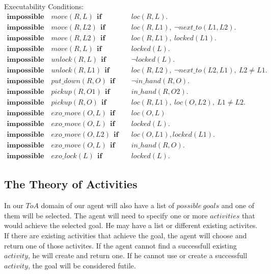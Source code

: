 \documentclass[11pt, oneside]{article}
\begin{document}
Executability Conditions:
\begin{align*}
  \mathbf{impossible}\quad move(R, L)~~\mathbf{if}&\quad loc(R,L).\\
  \mathbf{impossible}\quad move(R, L2)~~\mathbf{if}&\quad loc(R,L1),~\neg next\_to(L1,L2).\\
  \mathbf{impossible}\quad move(R,L2)~~\mathbf{if}&\quad loc(R,L1),~locked(L1).\\
  \mathbf{impossible}\quad move(R,L)~~\mathbf{if}&\quad locked(L).\\
  \mathbf{impossible}\quad unlock(R, L)~~\mathbf{if}&\quad \neg locked(L).\\
  \mathbf{impossible}\quad unlock(R, L1)~~\mathbf{if}&\quad loc(R,L2),~\neg next\_to(L2,L1),~L2\neq L1.\\
  \mathbf{impossible}\quad put\_down(R,O)~~\mathbf{if}&\quad \neg in\_hand(R,O).\\
  \mathbf{impossible}\quad pickup(R,O1)~~\mathbf{if}&\quad in\_hand(R,O2).\\
  \mathbf{impossible}\quad pickup(R,O)~~\mathbf{if}&\quad loc(R,L1),~loc(O,L2),~L1 \neq L2.\\
  \mathbf{impossible}\quad exo\_move(O,L)~~\mathbf{if}&\quad loc(O,L)\\
  \mathbf{impossible}\quad exo\_move(O,L)~~\mathbf{if}&\quad locked(L).\\
  \mathbf{impossible}\quad exo\_move(O,L2)~~\mathbf{if}&\quad loc(O,L1), locked(L1).\\
  \mathbf{impossible}\quad exo\_move(O,L)~~\mathbf{if}&\quad in\_hand(R,O).\\
  \mathbf{impossible}\quad exo\_lock(L)~~\mathbf{if}&\quad locked(L).
\end{align*}





\subsection{The Theory of Activities}
In our $ToA$ domain of our agent will also have a list of $possible\ goals$ and one of them will be selected. The agent will need to specify one or more $activities$ that would achieve the selected goal. He may have a list or different existing activites. If there are existing activities that achieve the goal, the agent will choose and return one of those activites. If the agent cannot find a successfull existing $activity$, he will create and return one. If he cannot use or create a successfull $activity$,  the goal will be considered futile. 
\end{document}
